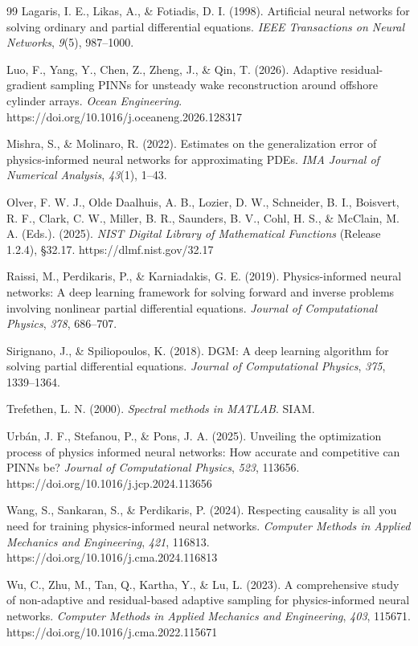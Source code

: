 \documentclass[11pt,a4paper]{article}
\theoremstyle{definition}
\begin{document}
\begin{thebibliography}{99}
Lagaris, I. E., Likas, A., \& Fotiadis, D. I. (1998). Artificial neural networks for solving ordinary and partial differential equations. \emph{IEEE Transactions on Neural Networks}, \emph{9}(5), 987--1000.

Luo, F., Yang, Y., Chen, Z., Zheng, J., \& Qin, T. (2026). Adaptive residual-gradient sampling {PINNs} for unsteady wake reconstruction around offshore cylinder arrays. \emph{Ocean Engineering}. https://doi.org/10.1016/j.oceaneng.2026.128317

Mishra, S., \& Molinaro, R. (2022). Estimates on the generalization error of physics-informed neural networks for approximating {PDEs}. \emph{IMA Journal of Numerical Analysis}, \emph{43}(1), 1--43.

Olver, F. W. J., Olde Daalhuis, A. B., Lozier, D. W., Schneider, B. I., Boisvert, R. F., Clark, C. W., Miller, B. R., Saunders, B. V., Cohl, H. S., \& McClain, M. A. (Eds.). (2025). \emph{{NIST} Digital Library of Mathematical Functions} (Release 1.2.4), \S 32.17. https://dlmf.nist.gov/32.17

Raissi, M., Perdikaris, P., \& Karniadakis, G. E. (2019). Physics-informed neural networks: A deep learning framework for solving forward and inverse problems involving nonlinear partial differential equations. \emph{Journal of Computational Physics}, \emph{378}, 686--707.

Sirignano, J., \& Spiliopoulos, K. (2018). {DGM}: A deep learning algorithm for solving partial differential equations. \emph{Journal of Computational Physics}, \emph{375}, 1339--1364.

Trefethen, L. N. (2000). \emph{Spectral methods in {MATLAB}}. SIAM.

Urb\'an, J. F., Stefanou, P., \& Pons, J. A. (2025). Unveiling the optimization process of physics informed neural networks: How accurate and competitive can {PINNs} be? \emph{Journal of Computational Physics}, \emph{523}, 113656. https://doi.org/10.1016/j.jcp.2024.113656

Wang, S., Sankaran, S., \& Perdikaris, P. (2024). Respecting causality is all you need for training physics-informed neural networks. \emph{Computer Methods in Applied Mechanics and Engineering}, \emph{421}, 116813. https://doi.org/10.1016/j.cma.2024.116813

Wu, C., Zhu, M., Tan, Q., Kartha, Y., \& Lu, L. (2023). A comprehensive study of non-adaptive and residual-based adaptive sampling for physics-informed neural networks. \emph{Computer Methods in Applied Mechanics and Engineering}, \emph{403}, 115671. https://doi.org/10.1016/j.cma.2022.115671

\end{thebibliography}
\end{document}
